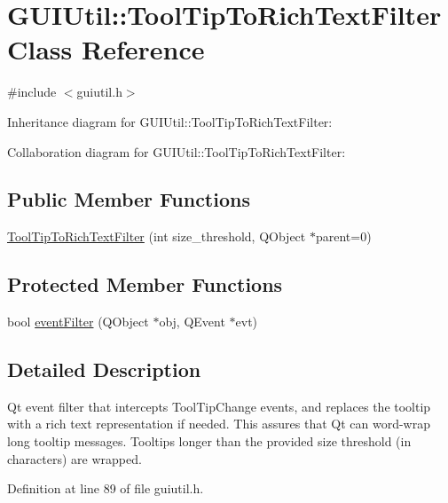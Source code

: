 \hypertarget{class_g_u_i_util_1_1_tool_tip_to_rich_text_filter}{}\section{G\+U\+I\+Util\+:\+:Tool\+Tip\+To\+Rich\+Text\+Filter Class Reference}
\label{class_g_u_i_util_1_1_tool_tip_to_rich_text_filter}


{\ttfamily \#include $<$guiutil.\+h$>$}



Inheritance diagram for G\+U\+I\+Util\+:\+:Tool\+Tip\+To\+Rich\+Text\+Filter\+:


Collaboration diagram for G\+U\+I\+Util\+:\+:Tool\+Tip\+To\+Rich\+Text\+Filter\+:
\subsection*{Public Member Functions}
\begin{DoxyCompactItemize}
\item 
\hyperlink{class_g_u_i_util_1_1_tool_tip_to_rich_text_filter_abdb48682c8ec34a8f774813cd9449f0d}{Tool\+Tip\+To\+Rich\+Text\+Filter} (int size\+\_\+threshold, Q\+Object $\ast$parent=0)
\end{DoxyCompactItemize}
\subsection*{Protected Member Functions}
\begin{DoxyCompactItemize}
\item 
bool \hyperlink{class_g_u_i_util_1_1_tool_tip_to_rich_text_filter_a5f4450d8b203f009a8bdc67d6d3f388c}{event\+Filter} (Q\+Object $\ast$obj, Q\+Event $\ast$evt)
\end{DoxyCompactItemize}


\subsection{Detailed Description}
Qt event filter that intercepts Tool\+Tip\+Change events, and replaces the tooltip with a rich text representation if needed. This assures that Qt can word-\/wrap long tooltip messages. Tooltips longer than the provided size threshold (in characters) are wrapped. 

Definition at line 89 of file guiutil.\+h.



